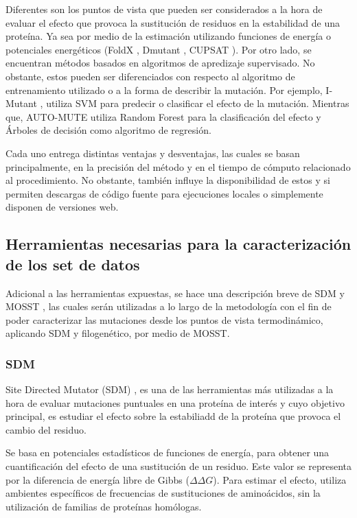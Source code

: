 Diferentes son los puntos de vista que pueden ser considerados a la hora de evaluar el efecto que provoca la sustitución de residuos en la estabilidad de una proteína. Ya sea por medio de la estimación utilizando funciones de energía o potenciales energéticos (FoldX \cite{Schymkowitz2005}, Dmutant \cite{Zhou2004}, CUPSAT \cite{Parthiban2006}). Por otro lado, se encuentran métodos basados en algoritmos de apredizaje supervisado. No obstante, estos pueden ser diferenciados con respecto al algoritmo de entrenamiento utilizado o a la forma de describir la mutación. Por ejemplo, I-Mutant \cite{Capriotti2005}, utiliza SVM para predecir o clasificar el efecto de la mutación. Mientras que, AUTO-MUTE \cite{Masso2010} utiliza Random Forest para la clasificación del efecto y Árboles de decisión como algoritmo de regresión.

Cada uno entrega distintas ventajas y desventajas, las cuales se basan principalmente, en la precisión del método y en el tiempo de cómputo relacionado al procedimiento. No obstante, también influye la disponibilidad de estos y si permiten descargas de código fuente para ejecuciones locales o simplemente disponen de versiones web. 


\subsection{Herramientas necesarias para la caracterización de los set de datos}

Adicional a las herramientas expuestas, se hace una descripción breve de SDM \cite{Pandurangan2017} y MOSST \cite{Olivera-Nappa2011}, las cuales serán utilizadas a lo largo de la metodología con el fin de poder caracterizar las mutaciones desde los puntos de vista termodinámico, aplicando SDM y filogenético, por medio de MOSST.

\subsubsection{SDM}

Site Directed Mutator (SDM) \cite{Pandurangan2017}, es una de las herramientas más utilizadas a la hora de evaluar mutaciones puntuales en una proteína de interés y cuyo objetivo principal, es estudiar el efecto sobre la estabiliadd de la proteína que provoca el cambio del residuo.

Se basa en potenciales estadísticos de funciones de energía, para obtener una cuantificación del efecto de una sustitución de un residuo. Este valor se representa por la diferencia de energía libre de Gibbs ($\Delta  \Delta G$). Para estimar el efecto, utiliza ambientes específicos de frecuencias de sustituciones de aminoácidos, sin la utilización de familias de proteínas homólogas. 


